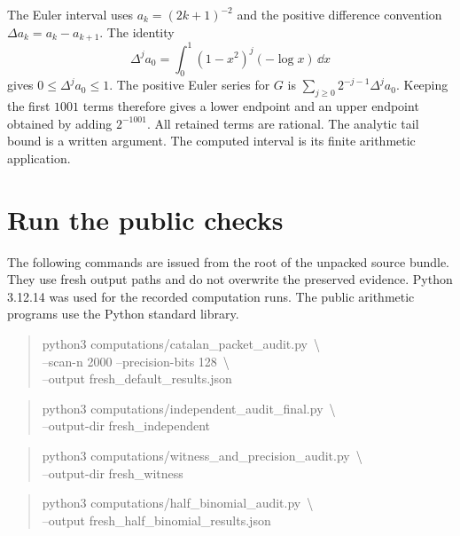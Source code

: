 The Euler interval uses $a_k=(2k+1)^{-2}$ and the positive difference convention $\Delta a_k=a_k-a_{k+1}$. The identity
\begin{equation*}
 \Delta^ja_0=\int_0^1(1-x^2)^j(-\log x)\,\dd x
\end{equation*}
gives $0\leq\Delta^ja_0\leq1$. The positive Euler series for $G$ is $\sum_{j\geq0}2^{-j-1}\Delta^ja_0$. Keeping the first $1001$ terms therefore gives a lower endpoint and an upper endpoint obtained by adding $2^{-1001}$. All retained terms are rational. The analytic tail bound is a written argument. The computed interval is its finite arithmetic application.

\section{Run the public checks}

The following commands are issued from the root of the unpacked source bundle. They use fresh output paths and do not overwrite the preserved evidence. Python 3.12.14 was used for the recorded computation runs. The public arithmetic programs use the Python standard library.

\begin{quote}\small\ttfamily\raggedright
python3 computations/catalan\_packet\_audit.py\ \textbackslash\\
\hspace*{1em}--scan-n 2000 --precision-bits 128\ \textbackslash\\
\hspace*{1em}--output fresh\_default\_results.json
\end{quote}

\begin{quote}\small\ttfamily\raggedright
python3 computations/independent\_audit\_final.py\ \textbackslash\\
\hspace*{1em}--output-dir fresh\_independent
\end{quote}

\begin{quote}\small\ttfamily\raggedright
python3 computations/witness\_and\_precision\_audit.py\ \textbackslash\\
\hspace*{1em}--output-dir fresh\_witness
\end{quote}

\begin{quote}\small\ttfamily\raggedright
python3 computations/half\_binomial\_audit.py\ \textbackslash\\
\hspace*{1em}--output fresh\_half\_binomial\_results.json
\end{quote}

